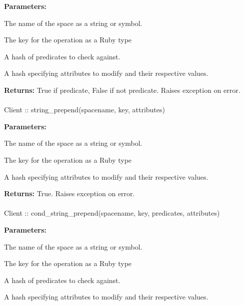 \noindent\textbf{Parameters:}
\begin{description}[labelindent=\widthof{{\code{predicates}}},leftmargin=*,noitemsep,nolistsep,align=right]
\item[\code{spacename}] The name of the space as a string or symbol.
\item[\code{key}] The key for the operation as a Ruby type
\item[\code{predicates}] A hash of predicates to check against.
\item[\code{attributes}] A hash specifying attributes to modify and their respective values.
\end{description}

\noindent\textbf{Returns:}
True if predicate, False if not predicate.  Raises exception on error.

\paragraph{}
\begin{ccode}
Client :: string_prepend(spacename, key, attributes)
\end{ccode}
\funcdesc 

\noindent\textbf{Parameters:}
\begin{description}[labelindent=\widthof{{\code{attributes}}},leftmargin=*,noitemsep,nolistsep,align=right]
\item[\code{spacename}] The name of the space as a string or symbol.
\item[\code{key}] The key for the operation as a Ruby type
\item[\code{attributes}] A hash specifying attributes to modify and their respective values.
\end{description}

\noindent\textbf{Returns:}
True.  Raises exception on error.

\paragraph{}
\begin{ccode}
Client :: cond_string_prepend(spacename, key, predicates, attributes)
\end{ccode}
\funcdesc 

\noindent\textbf{Parameters:}
\begin{description}[labelindent=\widthof{{\code{predicates}}},leftmargin=*,noitemsep,nolistsep,align=right]
\item[\code{spacename}] The name of the space as a string or symbol.
\item[\code{key}] The key for the operation as a Ruby type
\item[\code{predicates}] A hash of predicates to check against.
\item[\code{attributes}] A hash specifying attributes to modify and their respective values.
\end{description}

